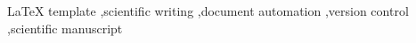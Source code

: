 
\begin{keyword}
LaTeX template \sep scientific writing \sep document automation \sep version control \sep scientific manuscript
\end{keyword}

